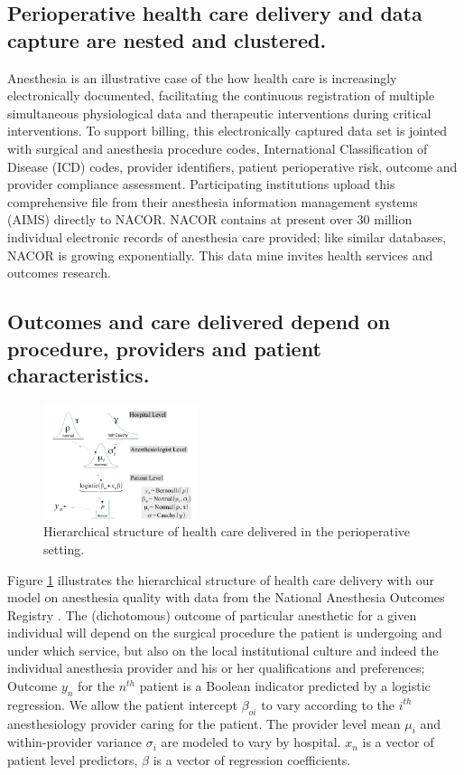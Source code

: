 \documentclass[11pt,notitlepage]{article}
\begin{document}
\subsection*{Perioperative health care delivery and data capture are nested and clustered.}
Anesthesia is an illustrative case of the how health care is increasingly electronically documented, facilitating the continuous registration of multiple simultaneous physiological data and therapeutic interventions during critical interventions. To support billing, this electronically captured data set is jointed with surgical and anesthesia procedure codes, International Classification of Disease (ICD) codes, provider identifiers, patient perioperative risk, outcome and provider compliance assessment. Participating institutions upload this comprehensive file from their anesthesia information management systems (AIMS) directly to NACOR. NACOR contains at present over 30 million individual electronic records of anesthesia care provided; like similar databases, NACOR is growing exponentially. This data mine invites health services and outcomes research.

\subsection*{Outcomes and care delivered depend on procedure, providers and patient characteristics.} 

\begin{figure} 
\includegraphics[width=0.4\textwidth]{Figures/DistrogramNACOR.pdf} 
\caption{Hierarchical structure of health care delivered in the perioperative setting.}
\label{fig:NACOR}
\end{figure}

Figure \ref{fig:NACOR} illustrates the hierarchical structure of health care delivery with our model on anesthesia quality with data from the National Anesthesia Outcomes Registry . The (dichotomous) outcome of particular anesthetic for a given individual will depend on the surgical procedure the patient is undergoing and under which service, but also on the local institutional culture and indeed the individual anesthesia provider and his or her qualifications and preferences\cite{AndreaeWhite2015}; Outcome $y_n$ for the $n^{th}$ patient is a Boolean indicator predicted by a logistic regression. We allow the patient intercept $\beta_{oi}$ to vary according to the $i^{th}$ anesthesiology provider caring for the patient. The provider level mean $\mu_i$ and within-provider variance $\sigma_i$ are modeled to vary by hospital. $x_n$ is a vector of patient level predictors, $\beta$ is a vector of regression coefficients.  
\end{document}
